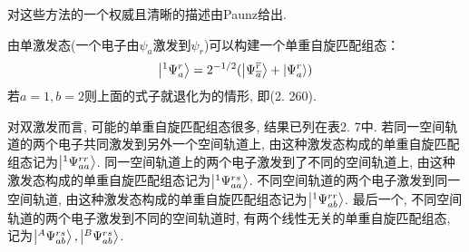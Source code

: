 对这些方法的一个权威且清晰的描述由Paunz给出.


由单激发态(一个电子由$\psi_a$激发到$\psi_r$)可以构建一个单重自旋匹配组态：
\begin{align}
\Ket{^1\Psi_a^r} = 2^{-1/2}(\Ket{\Psi_{\overline{a}}^{\overline{r}}} + \Ket{\Psi_a^r})
\end{align}
若$a=1,b=2$则上面的式子就退化为的情形, 
即(2.
260).


对双激发而言, 
可能的单重自旋匹配组态很多, 
结果已列在表2.
7中. 
若同一空间轨道的两个电子共同激发到另外一个空间轨道上, 
由这种激发态构成的单重自旋匹配组态记为$\Ket{^1\Psi_{aa}^{rr}}$. 
同一空间轨道上的两个电子激发到了不同的空间轨道上, 
由这种激发态构成的单重自旋匹配组态记为$\Ket{^1\Psi_{aa}^{rs}}$. 
不同空间轨道的两个电子激发到同一空间轨道, 
由这种激发态构成的单重自旋匹配组态记为$\Ket{^1\Psi_{ab}^{rr}}$. 
最后一个, 
不同空间轨道的两个电子激发到不同的空间轨道时, 
有两个线性无关的单重自旋匹配组态, 
记为$\Ket{^A\Psi_{ab}^{rs}}, \Ket{^B\Psi_{ab}^{rs}}$.


